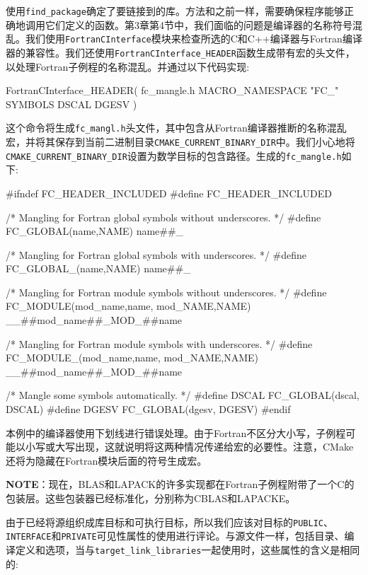 
使用\texttt{find\_package}确定了要链接到的库。方法和之前一样，需要确保程序能够正确地调用它们定义的函数。第3章第4节中，我们面临的问题是编译器的名称符号混乱。我们使用\texttt{FortranCInterface}模块来检查所选的C和C++编译器与Fortran编译器的兼容性。我们还使用\texttt{FortranCInterface\_HEADER}函数生成带有宏的头文件，以处理Fortran子例程的名称混乱。并通过以下代码实现:

\begin{codebox}[cmake]
FortranCInterface_HEADER(
  fc_mangle.h
  MACRO_NAMESPACE "FC_"
  SYMBOLS DSCAL DGESV
)
\end{codebox}

这个命令将生成\texttt{fc\_mangl.h}头文件，其中包含从Fortran编译器推断的名称混乱宏，并将其保存到当前二进制目录\texttt{CMAKE\_CURRENT\_BINARY\_DIR}中。我们小心地将\texttt{CMAKE\_CURRENT\_BINARY\_DIR}设置为数学目标的包含路径。生成的\texttt{fc\_mangle.h}如下:

\begin{codebox}[cpp]
#ifndef FC_HEADER_INCLUDED
#define FC_HEADER_INCLUDED

/* Mangling for Fortran global symbols without underscores. */
#define FC_GLOBAL(name,NAME) name##_

/* Mangling for Fortran global symbols with underscores. */
#define FC_GLOBAL_(name,NAME) name##_

/* Mangling for Fortran module symbols without underscores. */
#define FC_MODULE(mod_name,name, mod_NAME,NAME) __##mod_name##_MOD_##name

/* Mangling for Fortran module symbols with underscores. */
#define FC_MODULE_(mod_name,name, mod_NAME,NAME) __##mod_name##_MOD_##name

/* Mangle some symbols automatically. */
#define DSCAL FC_GLOBAL(dscal, DSCAL)
#define DGESV FC_GLOBAL(dgesv, DGESV)
#endif
\end{codebox}

本例中的编译器使用下划线进行错误处理。由于Fortran不区分大小写，子例程可能以小写或大写出现，这就说明将这两种情况传递给宏的必要性。注意，CMake还将为隐藏在Fortran模块后面的符号生成宏。

\begin{myInfoBox}
\textbf{NOTE}：现在，BLAS和LAPACK的许多实现都在Fortran子例程附带了一个C的包装层。这些包装器已经标准化，分别称为CBLAS和LAPACKE。
\end{myInfoBox}

由于已经将源组织成库目标和可执行目标，所以我们应该对目标的\texttt{PUBLIC}、\texttt{INTERFACE}和\texttt{PRIVATE}可见性属性的使用进行评论。与源文件一样，包括目录、编译定义和选项，当与\texttt{target\_link\_libraries}一起使用时，这些属性的含义是相同的:

